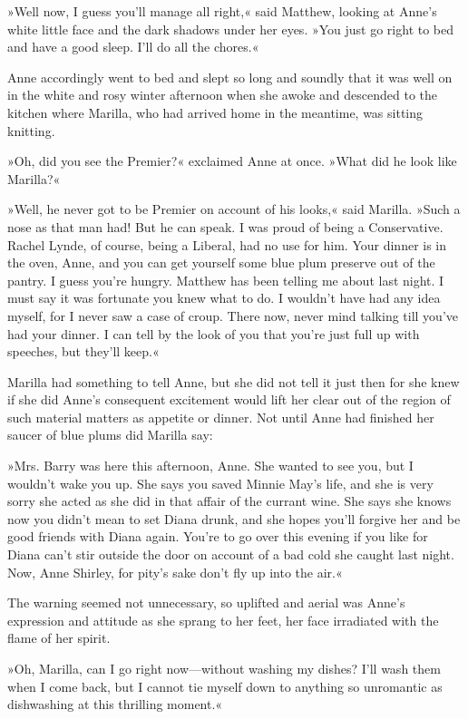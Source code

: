 »Well now, I guess you'll manage all right,« said Matthew, looking at Anne's white little face and the dark shadows under her eyes. »You just go right to bed and have a good sleep. I'll do all the chores.«

Anne accordingly went to bed and slept so long and soundly that it was well on in the white and rosy winter afternoon when she awoke and descended to the kitchen where Marilla, who had arrived home in the meantime, was sitting knitting.

»Oh, did you see the Premier?« exclaimed Anne at once. »What did he look like Marilla?«

»Well, he never got to be Premier on account of his looks,« said Marilla. »Such a nose as that man had! But he can speak. I was proud of being a Conservative. Rachel Lynde, of course, being a Liberal, had no use for him. Your dinner is in the oven, Anne, and you can get yourself some blue plum preserve out of the pantry. I guess you're hungry. Matthew has been telling me about last night. I must say it was fortunate you knew what to do. I wouldn't have had any idea myself, for I never saw a case of croup. There now, never mind talking till you've had your dinner. I can tell by the look of you that you're just full up with speeches, but they'll keep.«

Marilla had something to tell Anne, but she did not tell it just then for she knew if she did Anne's consequent excitement would lift her clear out of the region of such material matters as appetite or dinner. Not until Anne had finished her saucer of blue plums did Marilla say:

»Mrs. Barry was here this afternoon, Anne. She wanted to see you, but I wouldn't wake you up. She says you saved Minnie May's life, and she is very sorry she acted as she did in that affair of the currant wine. She says she knows now you didn't mean to set Diana drunk, and she hopes you'll forgive her and be good friends with Diana again. You're to go over this evening if you like for Diana can't stir outside the door on account of a bad cold she caught last night. Now, Anne Shirley, for pity's sake don't fly up into the air.«

The warning seemed not unnecessary, so uplifted and aerial was Anne's expression and attitude as she sprang to her feet, her face irradiated with the flame of her spirit.

»Oh, Marilla, can I go right now—without washing my dishes? I'll wash them when I come back, but I cannot tie myself down to anything so unromantic as dishwashing at this thrilling moment.«

